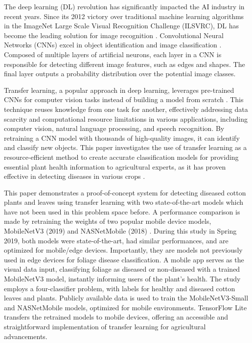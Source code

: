 \documentclass[conference]{IEEEtran}
\begin{document}
The deep learning (DL) revolution has significantly impacted the AI industry in recent years. Since its 2012 victory over traditional machine learning algorithms in the ImageNet Large Scale Visual Recognition Challenge (ILSVRC), DL has become the leading solution for image recognition \cite{Ashqar-Naser}\cite{Gehlot-Saini}. Convolutional Neural Networks (CNNs) excel in object identification and image classification \cite{Sarangdhar-Pawar}. Composed of multiple layers of artificial neurons, each layer in a CNN is responsible for detecting different image features, such as edges and shapes. The final layer outputs a probability distribution over the potential image classes.

Transfer learning, a popular approach in deep learning, leverages pre-trained CNNs for computer vision tasks instead of building a model from scratch \cite{Brownlee}. This technique reuses knowledge from one task for another, effectively addressing data scarcity and computational resource limitations in various applications, including computer vision, natural language processing, and speech recognition. By retraining a CNN model with thousands of high-quality images, it can identify and classify new objects. This paper investigates the use of transfer learning as a resource-efficient method to create accurate classification models for providing essential plant health information to agricultural experts, as it has proven effective in detecting diseases in various crops \cite{Disease Detection} \cite{Disease Diagnosing}.

This paper demonstrates a proof-of-concept system for detecting diseased cotton plants and leaves using transfer learning with two state-of-the-art models which have not been used in this problem space before. A performance comparison is made by retraining the weights of two popular mobile device models, MobileNetV3 (2019) and NASNetMobile (2018) \cite{WandB}. During this study in Spring 2019, both models were state-of-the-art, had similar performances, and are optimized for mobile/edge devices. Importantly, they are models not previously used in edge devices for foliage disease classification. A mobile app serves as the visual data input, classifying foliage as diseased or non-diseased with a trained MobileNetV3 model, instantly informing users of the plant's health. The study employs a four-classifier problem, with labels for healthy and diseased cotton leaves and plants. Publicly available data \cite{Kaggle} is used to train the MobileNetV3-Small and NASNetMobile models, optimized for mobile environments. TensorFlow Lite transfers the retrained models to mobile devices, offering an accessible and straightforward implementation of transfer learning for agricultural advancements.
\end{document}
